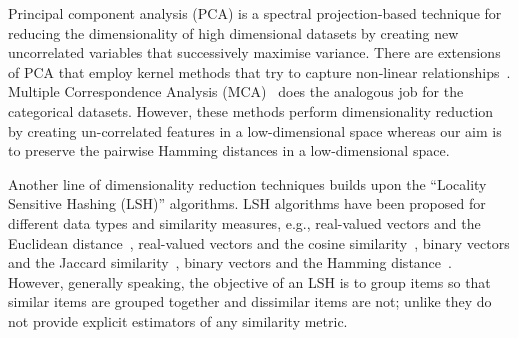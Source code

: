 
Principal component analysis (PCA) is a spectral projection-based technique for reducing the dimensionality of high dimensional datasets by creating new uncorrelated variables that successively maximise variance. There are extensions of PCA that employ kernel methods that try to capture non‐linear relationships~\cite{ScholkopfSM97}. {Multiple Correspondence Analysis (MCA)}~\cite{MCA} does the analogous job for the categorical datasets. However, these methods perform dimensionality reduction by creating un-correlated features in a low-dimensional space whereas our aim is to preserve the pairwise Hamming distances in a low-dimensional space.

Another line of dimensionality reduction techniques builds upon the ``Locality Sensitive Hashing (LSH)'' algorithms. LSH algorithms have been proposed for different data types and similarity measures, e.g., real-valued vectors and the Euclidean distance~\cite{IM98}, real-valued vectors and the cosine similarity~\cite{simhash}, binary vectors and the Jaccard similarity~\cite{BroderCFM98}, binary vectors and the Hamming distance~\cite{GIM99}. However, generally speaking, the objective of an LSH is to group items so that similar items are grouped together and dissimilar items are not; unlike \fsketch they do not provide explicit estimators of any similarity metric.


